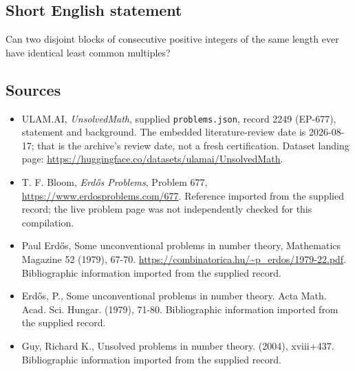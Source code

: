 \documentclass[11pt,a4paper]{article}
\begin{document}
\subsection{Short English statement}

Can two disjoint blocks of consecutive positive integers of the same length ever have identical least common multiples?

\subsection{Sources}

{\small

\begin{itemize}

\item[\hypertarget{source:2249:1}{S1}] ULAM.AI, \emph{UnsolvedMath}, supplied \texttt{problems.json}, record 2249 (EP-677), statement and background. The embedded literature-review date is 2026-08-17; that is the archive’s review date, not a fresh certification. Dataset landing page: \url{https://huggingface.co/datasets/ulamai/UnsolvedMath}.

\item[\hypertarget{source:2249:2}{S2}] T. F. Bloom, \emph{Erdős Problems}, Problem 677, \url{https://www.erdosproblems.com/677}. Reference imported from the supplied record; the live problem page was not independently checked for this compilation.

\item[\hypertarget{source:2249:3}{S3}] Paul Erdős, Some unconventional problems in number theory, Mathematics Magazine 52 (1979), 67-70. \url{https://combinatorica.hu/~p_erdos/1979-22.pdf}. Bibliographic information imported from the supplied record.

\item[\hypertarget{source:2249:4}{S4}] Erd\H{o}s, P., Some unconventional problems in number theory. Acta Math. Acad. Sci. Hungar. (1979), 71-80. Bibliographic information imported from the supplied record.

\item[\hypertarget{source:2249:5}{S5}] Guy, Richard K., Unsolved problems in number theory. (2004), xviii+437. Bibliographic information imported from the supplied record.

\end{itemize}

}

\label{end:2249}
\end{document}
